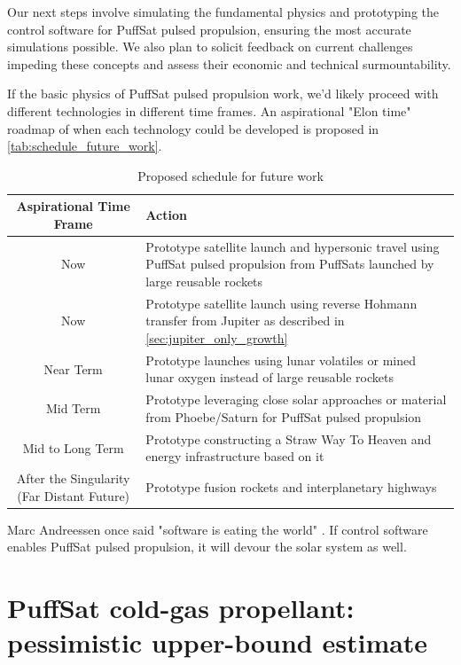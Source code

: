 \documentclass{article}
\begin{document}
Our next steps involve simulating the fundamental physics and prototyping the control software for PuffSat pulsed propulsion, ensuring the most accurate simulations possible. We also plan to solicit feedback on current challenges impeding these concepts and assess their economic and technical surmountability.

If the basic physics of PuffSat pulsed propulsion work, we'd likely proceed with different technologies in different time frames.  An aspirational "Elon time" \cite{wiktionary_elon_time} roadmap of when each technology could be  developed is proposed in \autoref{tab:schedule_future_work}.


\begin{table}[htpb]
    \centering
    \begin{tabularx}{\textwidth}{|c|L|}\hline
        \textbf{Aspirational Time Frame} & \textbf{Action} \\\hline
        Now & Prototype satellite launch and hypersonic travel using PuffSat pulsed propulsion from PuffSats launched by large reusable rockets\\\hline
        Now & Prototype satellite launch using reverse Hohmann transfer from Jupiter as described in \autoref{sec:jupiter_only_growth} \\\hline
        Near Term & Prototype launches using lunar volatiles or mined lunar oxygen instead of large reusable rockets \\\hline
        Mid Term & Prototype leveraging close solar approaches or material from Phoebe/Saturn for PuffSat  pulsed propulsion \\\hline
        Mid to Long Term & Prototype constructing a Straw Way To Heaven and energy infrastructure based on it \\\hline
        After the Singularity (Far Distant Future) & Prototype fusion rockets and interplanetary highways \\\hline
    \end{tabularx}
    \caption{Proposed schedule for future work}
    \label{tab:schedule_future_work}
\end{table}

Marc Andreessen once said "software is eating the world" \cite{andreessen_software}.   If control software enables PuffSat pulsed propulsion, it will devour the solar system as well.

\appendix 

\section{PuffSat cold-gas propellant: pessimistic upper-bound estimate}\label{sec:estimate_cold_gas}
\end{document}
